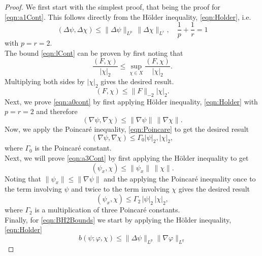 \begin{proof}
  We first start with the simplest proof, that being the proof for
  \eqref{eqn:a1Cont}. This follows directly from the H\"older inequality, \eqref{eqn:Holder}, i.e.
  \begin{equation*}
    (\Delta \psi, \Delta \chi) \le \|\Delta \psi\|_{L^p}\,\|\Delta \chi\|_{L^r},
    \quad \frac{1}{p} + \frac{1}{r} = 1
  \end{equation*}
  with $p=r=2$. \\
  The bound \eqref{eqn:lCont} can be proven by first noting that
  \begin{equation*}
    \frac{(F,\chi)}{|\chi|_2} \le \sup_{\chi \in X} \frac{(F,\chi)}{|\chi|_2}.
  \end{equation*}
  Multiplying both sides by $|\chi|_2$ gives the desired result.
  \begin{equation*}
    (F,\chi) \le \|F\|_{-2}|\chi|_2.
  \end{equation*}
  Next, we prove \eqref{eqn:a0cont} by first applying H\"older inequality, \eqref{eqn:Holder} with
  $p=r=2$ and therefore
  \begin{equation*}
    (\nabla \psi, \nabla \chi) \le \|\nabla \psi\|\, \|\nabla \chi\|.
  \end{equation*}
  Now, we apply the Poincar\'e inequality, \eqref{eqn:Poincare} to get the desired result
  \begin{equation*}
    (\nabla \psi, \nabla \chi) \le \Gamma_0 |\psi|_2, |\chi|_2,
  \end{equation*}
  where $\Gamma_0$ is the Poincar\'e constant. \\
  Next, we will prove \eqref{eqn:a3Cont} by first applying the H\"older
  inequality to get
  \begin{equation*}
    (\psi_x, \chi) \le \|\psi_x\|\, \|\chi\|.
  \end{equation*}
  Noting that $\|\psi_x\| \le \|\nabla \psi\|$ and the applying the Poincar\'e
  inequality once to the term involving $\psi$ and twice to the term involving
  $\chi$ gives the desired result
  \begin{equation*}
    (\psi_x, \chi) \le \Gamma_2\,|\psi|_2\, |\chi|_2,
  \end{equation*}
  where $\Gamma_2$ is a multiplication of three Poincar\'e constants. \\
  Finally, for \eqref{eqn:BH2Bounds} we start by applying the H\"older inequality, \eqref{eqn:Holder}
  \begin{equation}
    b(\psi;\varphi,\chi) \le \|\Delta \psi\|_{L^p} \|\nabla \varphi\|_{L^q}

\end{equation}
\end{proof}
